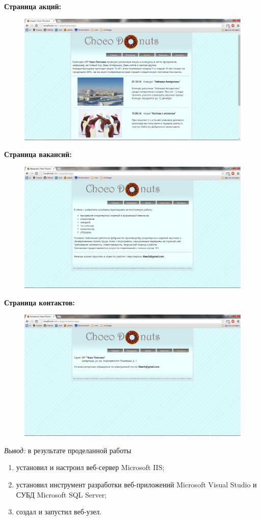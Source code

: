 \documentclass[pscyr,12pt]{hedlab}
\begin{document}
  \textbf{Страница акций:}
  \begin{figure}[h!]
    \center
    \includegraphics[width=.95\textwidth]{event}
  \end{figure}
  
  \newpage
  
  \textbf{Страница вакансий:}
  \begin{figure}[h!]
    \center
    \includegraphics[width=.95\textwidth]{job}
  \end{figure}
  
  \textbf{Страница контактов:}
  \begin{figure}[h!]
    \center
    \includegraphics[width=.95\textwidth]{contacts}
  \end{figure}
  
  \emph{Вывод:} в результате проделанной работы
  \begin{enumerate}
    \item установил и настроил веб-сервер Microsoft IIS;
    \item установил инструмент разработки веб-приложений Microsoft Visual
      Studio и СУБД Microsoft SQL Server;
    \item создал и запустил веб-узел.
  \end{enumerate}
\end{document}

